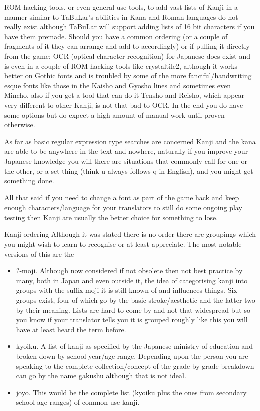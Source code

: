 \documentclass[
]{book}
\providecommand{\tightlist}{%
  \setlength{\itemsep}{0pt}\setlength{\parskip}{0pt}}
\begin{document}
ROM hacking tools, or even general use tools, to add vast lists of Kanji in a manner similar to TaBuLar's abilities in Kana and Roman languages do not really exist although TaBuLar will support adding lists of 16 bit characters if you have them premade. Should you have a common ordering (or a couple of fragments of it they can arrange and add to accordingly) or if pulling it directly from the game; OCR (optical character recognition) for Japanese does exist and is even in a couple of ROM hacking tools like crystaltile2, although it works better on Gothic fonts and is troubled by some of the more fanciful/handwriting esque fonts like those in the Kaisho and Gyosho lines and sometimes even Mincho, also if you get a tool that can do it Tensho and Reisho, which appear very different to other Kanji, is not that bad to OCR. In the end you do have some options but do expect a high amount of manual work until proven otherwise.

As far as basic regular expression type searches are concerned Kanji and the kana are able to be anywhere in the text and nowhere, naturally if you improve your Japanese knowledge you will there are situations that commonly call for one or the other, or a set thing (think u always follows q in English), and you might get something done.

All that said if you need to change a font as part of the game hack and keep enough characters/language for your translators to still do some ongoing play testing then Kanji are usually the better choice for something to lose.

Kanji ordering Although it was stated there is no order there are groupings which you might wish to learn to recognise or at least appreciate. The most notable versions of this are the

\begin{itemize}
\tightlist
\item
  ?-moji. Although now considered if not obsolete then not best practice by many, both in Japan and even outside it, the idea of categorising kanji into groups with the suffix moji it is still known of and influences things. Six groups exist, four of which go by the basic stroke/aesthetic and the latter two by their meaning. Lists are hard to come by and not that widespread but so you know if your translator tells you it is grouped roughly like this you will have at least heard the term before.
\item
  kyoiku. A list of kanji as specified by the Japanese ministry of education and broken down by school year/age range. Depending upon the person you are speaking to the complete collection/concept of the grade by grade breakdown can go by the name gakushu although that is not ideal.
\item
  joyo. This would be the complete list (kyoiku plus the ones from secondary school age ranges) of common use kanji.
\end{itemize}
\end{document}

